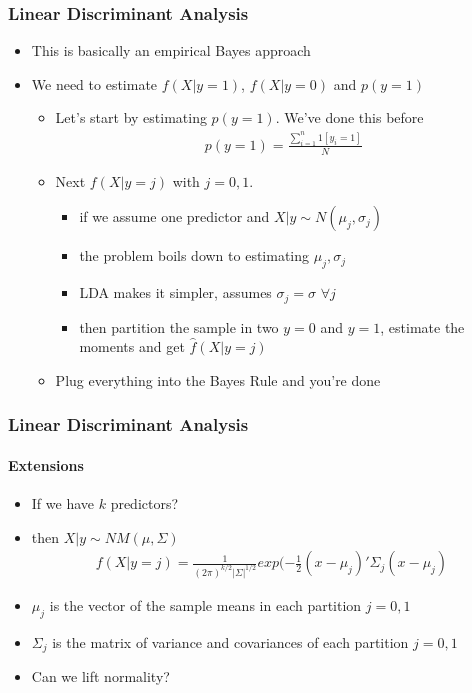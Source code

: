 \documentclass[
  shownotes,
  xcolor={svgnames},
  hyperref={colorlinks,citecolor=DarkBlue,linkcolor=DarkRed,urlcolor=DarkBlue}
  , aspectratio=169]{beamer}
\begin{document}
\begin{frame}[fragile]
\frametitle{Linear Discriminant Analysis}
\begin{itemize}
  \item This is basically an empirical Bayes approach
  \item We need to estimate $f(X|y=1)$,  $f(X|y=0)$ and $p(y=1)$ 
  \begin{itemize}
    \item Let's start by estimating $p(y=1)$. We've done this before
    \begin{align}
    p(y=1) = \frac{\sum_{i=1}^n 1[y_i=1]}{N}
    \end{align}
    \item Next $f(X|y=j)$ with $j=0,1$. 
    \begin{itemize}
    \item if we assume one predictor and $X|y\sim N(\mu_j,\sigma_j)$
    \item the problem boils down to estimating $\mu_j,\sigma_j$
    \item LDA makes it simpler, assumes $\sigma_j=\sigma$ $\forall j$
    \item then partition the sample in two $y=0$ and $y=1$, estimate the moments and get $\hat{f}(X|y=j)$
    \end{itemize}
    \item Plug everything into the Bayes Rule and you're done
    

  \end{itemize}
\end{itemize}


\end{frame}
\begin{frame}[fragile]
\frametitle{Linear Discriminant Analysis}
\framesubtitle{Extensions}

\begin{itemize}
    \item If we have $k$ predictors?
    \medskip
    \item then $X|y\sim NM(\mu,\Sigma)$
    \begin{align}
    f(X|y=j) = \frac{1}{(2\pi)^{k/2}|\Sigma|^{1/2}}exp(-\frac{1}{2}(x-\mu_j)'\Sigma_j(x-\mu_j)
    \end{align}
    \item $\mu_j$ is the vector of the sample means in each partition $j=0,1$
    \medskip
    \item $\Sigma_j$ is the matrix of variance and covariances of each partition $j=0,1$
    \medskip
    \item Can we lift normality? 
    \end{itemize}
\end{frame}
\end{document}
